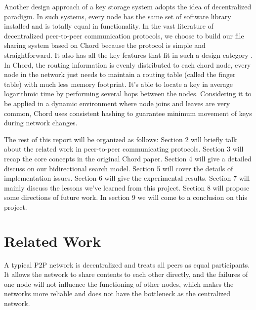 \documentclass[letterpaper,twocolumn,10pt]{article}
\begin{document}
Another design approach of a key storage system adopts the idea of decentralized paradigm. In such systems, every node has the same set of software library installed and is totally equal in functionality. In the vast literature of decentralized peer-to-peer communication protocols, we choose to build our file sharing system based on Chord because the protocol is simple and straightforward. It also has all the key features that fit in such a design category . In Chord, the routing information is evenly distributed to each chord node, every node in the network just needs to maintain a routing table (called the finger table) with much less memory footprint. It's able to locate a key in average logarithmic time by performing several hops between the nodes. Considering it to be applied in a dynamic environment where node joins and leaves are very common, Chord uses consistent hashing to guarantee minimum movement of keys during network changes. 

The rest of this report will be organized as follows: Section 2 will briefly talk about the related work in peer-to-peer communicating protocols. Section 3 will recap the core concepts in the original Chord paper. Section 4 will give a detailed discuss on our bidirectional search model. Section 5 will cover the details of implementation issues. Section 6 will give the experimental results. Section 7 will mainly discuss the lessons we've learned from this project. Section 8 will propose some directions of  future work. In section 9 we will come to a conclusion on this project.

\section{Related Work}

A typical P2P network is decentralized and treats all peers as equal participants. It allows the network to share contents to each other directly, and the failures of one node will not influence the functioning of other nodes, which makes the networks more reliable and does not have the bottleneck as the centralized network.
\end{document}

